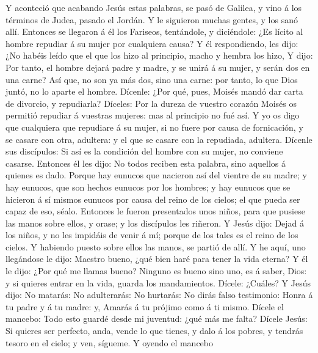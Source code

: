  Y aconteció que acabando Jesús estas palabras, se pasó de
Galilea, y vino á los términos de Judea, pasado el Jordán.
 Y le siguieron muchas gentes, y los sanó allí.
 Entonces se llegaron á él los Fariseos, tentándole, y
diciéndole: ¿Es lícito al hombre repudiar á su mujer por cualquiera
causa?  Y él respondiendo, les dijo: ¿No habéis leído que
el que los hizo al principio, macho y hembra los hizo,  Y
dijo: Por tanto, el hombre dejará padre y madre, y se unirá á su mujer,
y serán dos en una carne?  Así que, no son ya más dos,
sino una carne: por tanto, lo que Dios juntó, no lo aparte el hombre.
 Dícenle: ¿Por qué, pues, Moisés mandó dar carta de
divorcio, y repudiarla?  Díceles: Por la dureza de vuestro
corazón Moisés os permitió repudiar á vuestras mujeres: mas al principio
no fué así.  Y yo os digo que cualquiera que repudiare á
su mujer, si no fuere por causa de fornicación, y se casare con otra,
adultera: y el que se casare con la repudiada, adultera. 
Dícenle sus discípulos: Si así es la condición del hombre con su mujer,
no conviene casarse.  Entonces él les dijo: No todos
reciben esta palabra, sino aquellos á quienes es dado. 
Porque hay eunucos que nacieron así del vientre de su madre; y hay
eunucos, que son hechos eunucos por los hombres; y hay eunucos que se
hicieron á sí mismos eunucos por causa del reino de los cielos; el que
pueda ser capaz de eso, séalo.  Entonces le fueron
presentados unos niños, para que pusiese las manos sobre ellos, y orase;
y los discípulos les riñeron.  Y Jesús dijo: Dejad á los
niños, y no les impidáis de venir á mí; porque de los tales es el reino
de los cielos.  Y habiendo puesto sobre ellos las manos,
se partió de allí.  Y he aquí, uno llegándose le dijo:
Maestro bueno, ¿qué bien haré para tener la vida eterna? 
Y él le dijo: ¿Por qué me llamas bueno? Ninguno es bueno sino uno, es á
saber, Dios: y si quieres entrar en la vida, guarda los mandamientos.
 Dícele: ¿Cuáles? Y Jesús dijo: No matarás: No
adulterarás: No hurtarás: No dirás falso testimonio: 
Honra á tu padre y á tu madre: y, Amarás á tu prójimo como á ti mismo.
 Dícele el mancebo: Todo esto guardé desde mi juventud:
¿qué más me falta?  Dícele Jesús: Si quieres ser
perfecto, anda, vende lo que tienes, y dalo á los pobres, y tendrás
tesoro en el cielo; y ven, sígueme.  Y oyendo el mancebo
